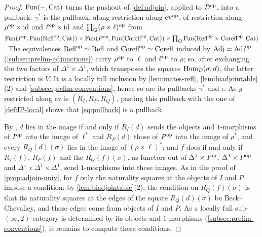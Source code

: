 \begin{proof}
%
$\operatorname{Fun}(-,\mathrm{Cat})$ turns the pushout of \cref{def:adjoin}, applied to $\mathcal{D}^{\mathrm{op}}$,
into a pullback: $\gamma^{*}$ is the pullback,
along restriction along $\mathrm{ev}^{\mathrm{op}}$, of restriction along
$\rho^{\mathrm{op}} \times \mathrm{id}$
and
$\ell^{\mathrm{op}} \times \mathrm{id}$
and
$\prod_{Q}(\rho \times \ell)^{\mathrm{op}}$
from
$\operatorname{Fun}(I^{\mathrm{op}},\operatorname{Fun}(\mathrm{Refl}^{\mathrm{op}},\mathrm{Cat})) \times
\operatorname{Fun}(P^{\mathrm{op}},\operatorname{Fun}(\mathrm{Corefl}^{\mathrm{op}},\mathrm{Cat})) \times
\prod_{Q}\operatorname{Fun}(\mathrm{Refl}^{\mathrm{op}} \times \mathrm{Corefl}^{\mathrm{op}},\mathrm{Cat})$.
The equivalences
$\mathrm{Refl}^{\mathrm{op}} \simeq \mathrm{Refl}$
and
$\mathrm{Corefl}^{\mathrm{op}} \simeq \mathrm{Corefl}$
induced by
$\mathrm{Adj} \simeq \mathrm{Adj}^{\mathrm{op}}$
(\cref{subsec:prelim-adjunctions}) carry $\rho^{\mathrm{op}}$ to $\ell$ and $\ell^{\mathrm{op}}$
to $\rho$; so, after exchanging the two factors of
$\Delta^{1} \times \Delta^{1}$,
which transposes the squares $\operatorname{Hom}_{\mathcal{D}}(\sigma,d)$,
the latter restriction is $V$.
It is a locally full inclusion by \cref{lem:mates-refl},
\cref{lem:biadjointable}(2) and \cref{subsec:prelim-conventions},
hence so are its pullbacks $\gamma^{*}$ and $\iota$.
As $y$ restricted along $\mathrm{ev}$ is $(R_{I},R_{P},R_{Q})$,
pasting this pullback with the one of \cref{def:IP-local} shows that
\eqref{eq:pullback} is a pullback.

By \cite[Cor.~2.6.6]{abellangagnahaugseng2024straightening},
$d$ lies in the image if and only if $R_{I}(d)$ sends the objects and
$1$-morphisms of $I^{\mathrm{op}}$ into the image of $\ell^{*}$ and $R_{P}(d)$ those of
$P^{\mathrm{op}}$ into the image of $\rho^{*}$, and every $R_{Q}(d)(\sigma)$ lies in
the image of
$(\rho \times \ell)^{*}$;
and $f$ does if and only if $R_{I}(f)$,
$R_{P}(f)$ and the $R_{Q}(f)(\sigma)$, as functors out of
$\Delta^{1} \times I^{\mathrm{op}}$,
$\Delta^{1} \times P^{\mathrm{op}}$
and
$\Delta^{1} \times \Delta^{1} \times \Delta^{1}$,
send $1$-morphisms into these images. As in the proof of
\cref{prop:adjoin-univ}, for $f$ only the naturality squares at the objects of
$I$ and $P$ impose a condition: by \cref{lem:biadjointable}(2), the condition
on $R_{Q}(f)(\sigma)$ is that its naturality squares at the edges of the
square $R_{Q}(d)(\sigma)$ be Beck--Chevalley, and these edges come from objects
of $I$ and $P$. As a locally full sub-$(\infty,2)$-category is
determined by its objects and $1$-morphisms (\cref{subsec:prelim-conventions}),
it remains to compute these conditions.


\end{proof}
